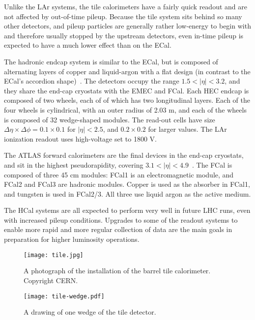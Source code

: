 Unlike the LAr systems, the tile calorimeters have a fairly quick readout and are not affected by out-of-time pileup. Because the tile system sits behind so many other detectors, and pileup particles are generally rather low-energy to begin with and therefore usually stopped by the upstream detectors, even in-time pileup is expected to have a much lower effect than on the ECal.

The hadronic endcap system is similar to the ECal, but is composed of alternating layers of copper and liquid-argon with a flat design (in contrast to the ECal's accordion shape)~\cite{ATLASPaper}. The detectors occupy the range $1.5 < |\eta| < 3.2$, and they share the end-cap cryostats with the EMEC and FCal.  Each HEC endcap is composed of two wheels, each of of which has two longitudinal layers. Each of the four wheels is cylindrical, with an outer radius of 2.03 m, and each of the wheels is composed of 32 wedge-shaped modules. The read-out cells have size $\Delta \eta \times \Delta\phi = 0.1 \times 0.1$ for $|\eta| < 2.5$, and $0.2 \times 0.2$ for larger values. The LAr ionization readout uses high-voltage set to 1800 V.

The ATLAS forward calorimeters are the final devices in the end-cap cryostats, and sit in the highest pseudorapidity, covering $3.1 < |\eta| < 4.9$~\cite{ATLASPaper}. The FCal is composed of three 45 cm modules: FCal1 is an electromagnetic module, and FCal2 and FCal3 are hadronic modules. Copper is used as the absorber in FCal1, and tungsten is used in FCal2/3. All three use liquid argon as the active medium.

The HCal systems are all expected to perform very well in future LHC runs, even with increased pileup conditions. Upgrades to some of the readout systems to enable more rapid and more regular collection of data are the main goals in preparation for higher luminosity operations.


\begin{figure}
\centering
\texttt{[image: tile.jpg]}
\label{fig:detector:barrel-tile}
\caption{A photograph of the installation of the barrel tile calorimeter. Copyright CERN.}
\end{figure}



\begin{figure}
\centering
\texttt{[image: tile-wedge.pdf]}
\label{fig:detector:tile-wedge}
\caption{A drawing of one wedge of the tile detector.}
\end{figure}

